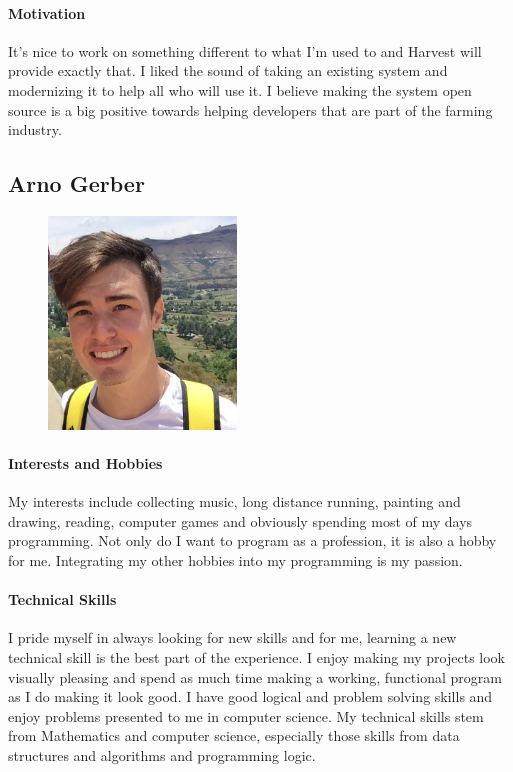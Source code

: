 \documentclass[english]{article}
\begin{document}
		\paragraph{Motivation}
		It's nice to work on something different to what I'm used to and Harvest will provide exactly that. I liked the sound of taking an existing system and modernizing it to help all who will use it. I believe making the system open source is a big positive towards helping developers that are part of the farming industry.
		
		\newpage
		\subsection{Arno Gerber}
		\begin{figure}
			\begin{center}
				\includegraphics[width=5cm]{arno.jpg}
			\end{center}
		\end{figure}
		\paragraph{Interests and Hobbies}
		My interests include collecting music, long distance running, painting and drawing, reading, computer games and obviously spending most of my days programming. Not only do I want to program as a profession, it is also a hobby for me. Integrating my other hobbies into my programming is my passion.
		
		\paragraph{Technical Skills}
		I pride myself in always looking for new skills and for me, learning a new technical skill is the best part of the experience. I enjoy making my projects look visually pleasing and spend as much time making a working, functional program as I do making it look good. I have good logical and problem solving skills and enjoy problems presented to me in computer science. My technical skills stem from Mathematics and computer science, especially those skills from data structures and algorithms and programming logic.
		
\end{document}

